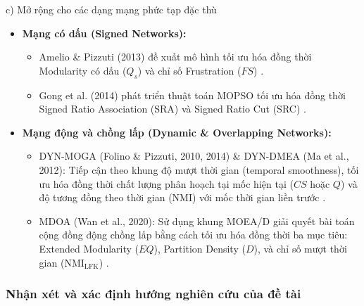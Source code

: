 \documentclass[14pt,a4paper]{extarticle}
\begin{document}
\noindent c) Mở rộng cho các dạng mạng phức tạp đặc thù
\begin{itemize}
    \item \textbf{Mạng có dấu (Signed Networks):}
    \begin{itemize}
        \item Amelio \& Pizzuti (2013) đề xuất mô hình tối ưu hóa đồng thời Modularity có dấu ($Q_s$) và chỉ số Frustration ($FS$) \cite{Baraa2021}.
        \item Gong et al. (2014) phát triển thuật toán MOPSO tối ưu hóa đồng thời Signed Ratio Association (SRA) và Signed Ratio Cut (SRC) \cite{Gong2016}.
    \end{itemize}
    \item \textbf{Mạng động và chồng lấp (Dynamic \& Overlapping Networks):}
    \begin{itemize}
        \item DYN-MOGA (Folino \& Pizzuti, 2010, 2014) \& DYN-DMEA (Ma et al., 2012): Tiếp cận theo khung độ mượt thời gian (temporal smoothness), tối ưu hóa đồng thời chất lượng phân hoạch tại mốc hiện tại ($CS$ hoặc $Q$) và độ tương đồng theo thời gian (NMI) với mốc thời gian liền trước \cite{Baraa2021}.
        \item MDOA (Wan et al., 2020): Sử dụng khung MOEA/D giải quyết bài toán cộng đồng động chồng lấp bằng cách tối ưu hóa đồng thời ba mục tiêu: Extended Modularity ($EQ$), Partition Density ($D$), và chỉ số mượt thời gian ($\text{NMI}_{\text{LFK}}$) \cite{Wan2020}.
    \end{itemize}
\end{itemize}

\subsubsection{Nhận xét và xác định hướng nghiên cứu của đề tài}
\end{document}
